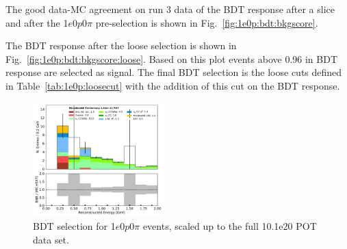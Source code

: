 \documentclass[a4paper]{article}
\newcommand{\zpsel}{1$e$0$p$0$\pi$ }
\begin{document}
The good data-MC agreement on run 3 data of the BDT response after a slice and after the \zpsel pre-selection is shown in Fig.~\ref{fig:1e0p:bdt:bkgscore}.  

The BDT response after the loose selection is shown in Fig.~\ref{fig:1e0p:bdt:bkgscore:loose}.  Based on this plot events above 0.96 in BDT response are selected as signal.  The final BDT selection is the loose cuts defined in Table~\ref{tab:1e0p:loosecut} with the addition of this cut on the BDT response. 
\\


\begin{figure}[H]
\begin{center}
\includegraphics[width=0.45\textwidth]{1e0p/reco_e_01162020_RUN3_bgbdt.pdf}
\caption{\label{fig:1e0p:bdt:RUN3} BDT selection for \zpsel events, scaled up to the full 10.1e20 POT data set.}
\end{center}
\end{figure}
\end{document}
